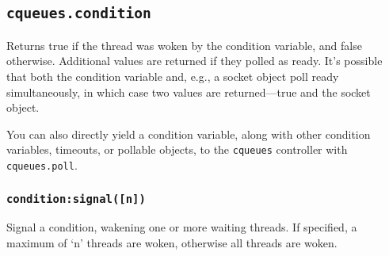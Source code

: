\documentclass[11pt, oneside]{memoir}
\newcommand*{\cqueues}[0]{\texttt{cqueues}\xspace}
\newcommand*{\fn}[1]{\texttt{#1}\xspace}
\newcounter{toccols}
\newenvironment{Module}[1]{
	\subsection{\texttt{#1}}
	\addtocontents{toc}{
		\protect\begin{multicols}{\value{toccols}}
	}
}{
	\addtocontents{toc}{\protect\end{multicols}}
}
\begin{document}
\begin{Module}{cqueues.condition}
Returns true if the thread was woken by the condition variable, and false otherwise. Additional values are returned if they polled as ready. It's possible that both the condition variable and, e.g., a socket object poll ready simultaneously, in which case two values are returned---true and the socket object.

You can also directly yield a condition variable, along with other condition variables, timeouts, or pollable objects, to the \cqueues controller with \fn{cqueues.poll}.

\subsubsection[\fn{condition:signal}]{\fn{condition:signal([n])}}

Signal a condition, wakening one or more waiting threads. If specified, a maximum of `n' threads are woken, otherwise all threads are woken.

\end{Module}
\end{document}
